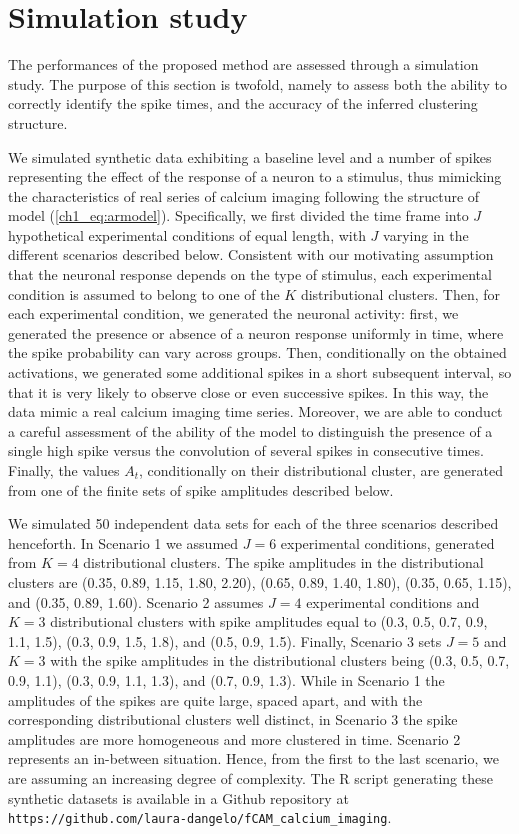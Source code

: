 \section{Simulation study}
\label{s:simulations}   

The performances of the proposed method are assessed through a simulation study. The purpose of this section is twofold, namely to assess both the ability to correctly identify the spike times, and the accuracy of the inferred clustering structure.  

We simulated synthetic data exhibiting a baseline level and a number of spikes representing the effect of the response of a neuron to a stimulus, thus mimicking the characteristics of real series of calcium imaging following the structure of model (\ref{ch1_eq:armodel}).
%
Specifically, we first divided the time frame into $J$ hypothetical experimental conditions of equal length, with $J$ varying in the different scenarios described below. Consistent with our motivating assumption that the neuronal response depends on the type of stimulus, each experimental condition is assumed to belong to one of the $K$ distributional clusters. Then, for each experimental condition, we generated the neuronal activity: first, we generated the presence or absence of a neuron response uniformly in time, where the spike probability can vary across groups. 
Then, conditionally on the obtained activations, we generated some additional spikes in a short subsequent interval, so that it is very likely to observe close or even successive spikes.
%
In this way, the data mimic a real calcium imaging time series. Moreover, we are able to conduct a careful assessment of the ability of the model to distinguish the presence of a single high spike versus the convolution of several spikes in consecutive times.
Finally, the values $A_t$, conditionally on their distributional cluster, are generated from one of the finite sets of spike amplitudes described below. 

We simulated 50 independent data sets for each of the three scenarios described henceforth. In Scenario 1 we assumed $J=6$ experimental conditions, generated from $K=4$ distributional clusters. 
%
The spike amplitudes in the distributional clusters are (0.35, 0.89, 1.15, 1.80, 2.20), (0.65, 0.89, 1.40, 1.80), (0.35, 0.65, 1.15), and (0.35, 0.89, 1.60).
%
Scenario 2 assumes $J=4$ experimental conditions and $K=3$ distributional clusters with spike amplitudes equal to (0.3, 0.5, 0.7, 0.9, 1.1, 1.5), (0.3, 0.9, 1.5, 1.8), and (0.5, 0.9, 1.5). 
%
Finally, Scenario 3 sets $J=5$ and $K=3$ with the spike amplitudes in the distributional clusters being (0.3, 0.5, 0.7, 0.9, 1.1), (0.3, 0.9, 1.1, 1.3), and (0.7, 0.9, 1.3). 
%
While in Scenario 1 the amplitudes of the spikes are quite large, spaced apart, and with the corresponding distributional clusters well distinct, in Scenario 3 the spike amplitudes are more homogeneous and more clustered in time. Scenario 2 represents an in-between situation. Hence, from the first to the last scenario, we are assuming an increasing degree of complexity. The R script generating these synthetic datasets is available in a Github repository at \texttt{https://github.com/laura-dangelo/fCAM\_calcium\_imaging}.

